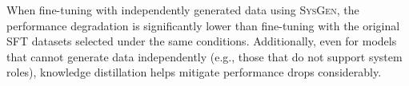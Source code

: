 When fine-tuning with independently generated data using \textsc{SysGen}, the performance degradation is significantly lower than fine-tuning with the original SFT datasets selected under the same conditions.
Additionally, even for models that cannot generate data independently (e.g., those that do not support system roles), knowledge distillation helps mitigate performance drops considerably.








